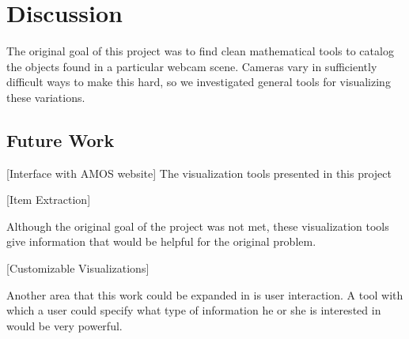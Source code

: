 \chapter{Discussion}
\label{cpt:discussion}

The original goal of this project was to find clean mathematical tools to catalog the objects found in a particular webcam scene.  Cameras vary in sufficiently difficult ways to make this hard, so we investigated general tools for visualizing these variations.

\section{Future Work}

[Interface with AMOS website]
The visualization tools presented in this project 

[Item Extraction]

Although the original goal of the project was not met, these visualization tools give information that would be helpful for the original problem.  

[Customizable Visualizations]

Another area that this work could be expanded in is user interaction.  A tool with which a user could specify what type of information he or she is interested in would be very powerful.




